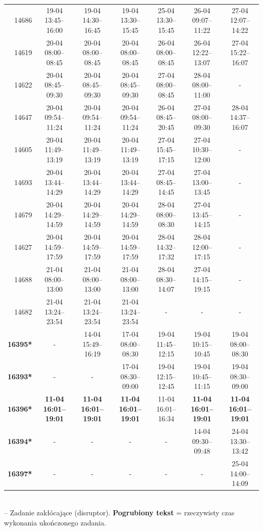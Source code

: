 \begin{table}[htbp]
\begin{tabular}{|r|c|c|c|c|c|c|}
14686 & 19-04 13:45--16:00 & 19-04 14:30--16:45 & 19-04 13:30--15:45 & 25-04 13:30--15:45 & 26-04 09:07--11:22 & 27-04 12:07--14:22 \\ 
14619 & 20-04 08:00--08:45 & 20-04 08:00--08:45 & 20-04 08:00--08:45 & 26-04 08:00--08:45 & 26-04 12:22--13:07 & 27-04 15:22--16:07 \\ 
14622 & 20-04 08:45--09:30 & 20-04 08:45--09:30 & 20-04 08:45--09:30 & 27-04 08:00--08:45 & 28-04 08:00--11:00 & - \\ 
14647 & 20-04 09:54--11:24 & 20-04 09:54--11:24 & 20-04 09:54--11:24 & 26-04 08:45--20:45 & 27-04 08:00--09:30 & 28-04 14:37--16:07 \\ 
14605 & 20-04 11:49--13:19 & 20-04 11:49--13:19 & 20-04 11:49--13:19 & 27-04 15:45--17:15 & 27-04 10:30--12:00 & - \\ 
14693 & 20-04 13:44--14:29 & 20-04 13:44--14:29 & 20-04 13:44--14:29 & 27-04 08:45--14:45 & 27-04 13:00--13:45 & - \\ 
14679 & 20-04 14:29--14:59 & 20-04 14:29--14:59 & 20-04 14:29--14:59 & 28-04 08:00--08:30 & 27-04 13:45--14:15 & - \\ 
14627 & 20-04 14:59--17:59 & 20-04 14:59--17:59 & 20-04 14:59--17:59 & 28-04 14:32--17:32 & 28-04 12:00--17:15 & - \\ 
14688 & 21-04 08:00--13:00 & 21-04 08:00--13:00 & 21-04 08:00--13:00 & 28-04 08:30--14:07 & 27-04 14:15--19:15 & - \\ 
14682 & 21-04 13:24--23:54 & 21-04 13:24--23:54 & 21-04 13:24--23:54 & - & - & - \\ 
\hline
\textbf{16395*} & - & 14-04 15:49--16:19 & 17-04 08:00--08:30 & 19-04 11:45--12:15 & 19-04 10:15--10:45 & 19-04 08:00--08:30 \\ 
\textbf{16393*} & - & - & 17-04 08:30--09:00 & 19-04 12:15--12:45 & 19-04 10:45--11:15 & 19-04 08:30--09:00 \\ 
\textbf{16396*} & \textbf{11-04 16:01--19:01} & \textbf{11-04 16:01--19:01} & \textbf{11-04 16:01--19:01} & 11-04 16:01--16:34 & \textbf{11-04 16:01--19:01} & \textbf{11-04 16:01--19:01} \\ 
\textbf{16394*} & - & - & - & - & 14-04 09:30--09:48 & 24-04 13:30--13:42 \\ 
\textbf{16397*} & - & - & - & - & - & 25-04 14:00--14:09 \\ 
\hline
\end{tabular}
\\ {\tiny * -- Zadanie zakłócające (disruptor). \textbf{Pogrubiony tekst} = rzeczywisty czas wykonania ukończonego zadania.}
\end{table}

